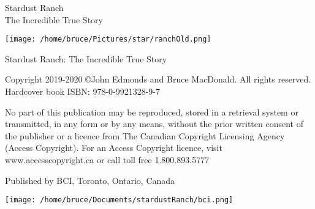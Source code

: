 \documentclass[letterpaper,11pt,twoside,titlepage,onecolumn,openany]{book}
\begin{document}
\newpage
\thispagestyle{empty}

\vspace{30mm}

\begin{center}
\huge{Stardust Ranch}\\
\large{The Incredible True Story}
\end{center}

\vspace{10mm}
\begin{center}
\texttt{[image: /home/bruce/Pictures/star/ranchOld.png]}

\end{center}

\newpage

\thispagestyle{empty}



\begin{center}



\large{Stardust Ranch: The Incredible True Story}

\end{center}




\vspace{5mm}
\noindent
Copyright 2019-2020 \copyright John Edmonds and Bruce MacDonald. All rights reserved.
Hardcover book ISBN: 978-0-9921328-9-7 


\vspace{5mm}
\noindent
No part of this publication may be reproduced, stored in a retrieval system or transmitted, in any form or by any means, without the prior written consent of the publisher or a licence from The Canadian Copyright Licensing Agency (Access Copyright). For an Access Copyright licence, visit www.accesscopyright.ca or call toll free 1.800.893.5777


\vspace{5mm}
\noindent
Published by BCI, Toronto, Ontario, Canada


\begin{center}


\texttt{[image: /home/bruce/Documents/stardustRanch/bci.png]}

\end{center}

\newpage{}
\thispagestyle{empty}

\section*{}
\end{document}
